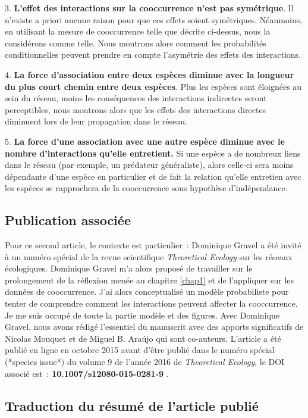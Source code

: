 3. \textbf{L'effet des interactions sur la cooccurrence n'est pas symétrique}.
Il n'existe a priori aucune raison pour que ces effets soient symétriques.
Néanmoins, en utilisant la mesure de cooccurrence telle que décrite ci-dessus,
nous la considérons comme telle. Nous montrons alors comment les probabilités
conditionnelles peuvent prendre en compte l'asymétrie des effets des interactions.

4. \textbf{La force d'association entre deux espèces diminue avec la longueur
du plus court chemin entre deux espèces}. Plus les espèces sont éloignées au sein
du réseau, moins les conséquences des interactions indirectes seront
perceptibles, nous montrons alors que les effets des interactions directes
diminuent lors de leur propagation dans le réseau.

5. \textbf{La force d'une association avec une autre espèce diminue avec le
nombre d'interactions qu'elle entretient.} Si une espèce a de nombreux liens
dans le réseau (par exemple, un prédateur généraliste), alors celle-ci sera
moins dépendante d'une espèce en particulier et de fait la relation qu'elle
entretien avec les espèces se rapprochera de la cooccurrence sous hypothèse
d'indépendance.


\subsection{Publication associée}

Pour ce second article, le contexte est particulier~: Dominique Gravel a été
invité à un numéro spécial de la revue scientifique \textit{Theoretical Ecology}
sur les réseaux écologiques. Dominique Gravel m'a alors proposé de travailler
sur le prolongement de la réflexion menée au chapitre \ref{chap1} et de
l'appliquer sur les données de cooccurrence. J'ai alors conceptualisé un
modèle probabiliste pour tenter de comprendre comment les interactions peuvent
affecter la cooccurrence. Je me suis occupé de toute la partie modèle et
des figures. Avec Dominique Gravel, nous avons rédigé l'essentiel du manuscrit
avec des apports significatifs de Nicolas Mouquet et de  Miguel B. Ara\'ujo qui
sont co-auteurs. L'article a été publié en ligne en octobre 2015 avant d'être
publié dans le numéro spécial (*species issue*) du volume 9 de l'année 2016 de
\textit{Theoretical Ecology}, le DOI associé est~: \textbf{10.1007/s12080-015-0281-9} \citep{Cazelles2016}.

\subsection{Traduction du résumé de l'article publié}

